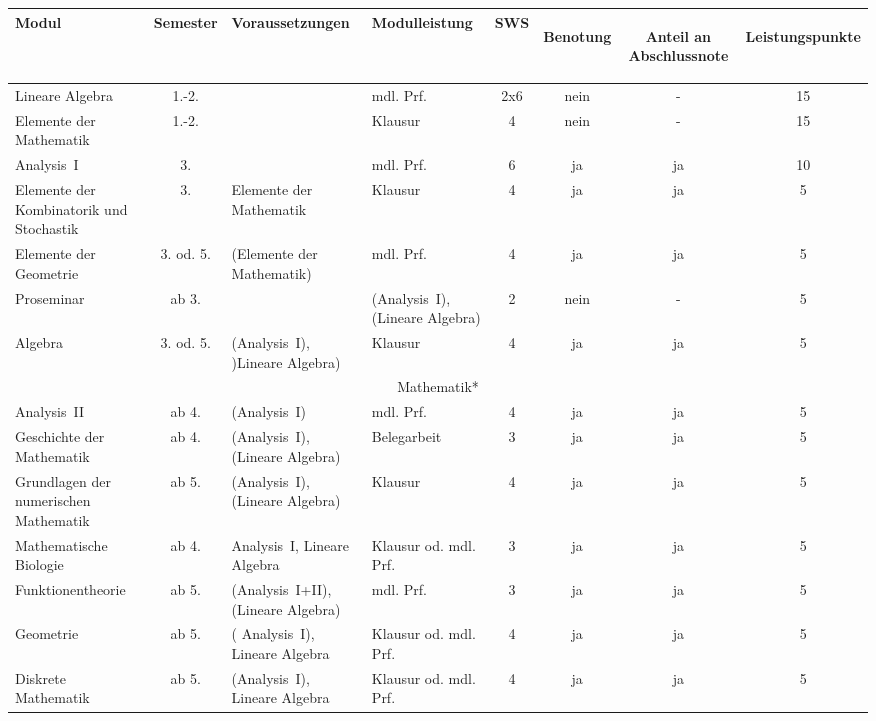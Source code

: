 \begin{table}[tbp]
    \begin{footnotesize}
    \begin{tabularx}{\textwidth}{|@{~}X@{~}|@{~}c@{~}|@{~}X@{~}|@{~}X@{~}|@{~}c@{~}|@{~}c@{~}|@{~}c@{~}|@{~}c@{~}|}
        \hline
        Modul & Semes\-ter & Voraus\-setzungen & Modul\-leistung & SWS & \begin{sideways}Be\-notung\end{sideways} & \begin{sideways}Anteil an Abschluss\-note \end{sideways}& \begin{sideways}Leistungspunkte\end{sideways}\\\hline\hline

        Lineare Algebra &1.-2.&&mdl. Prf.&2x6&nein&-&15\\\hline
        Elemente der Mathematik &1.-2.&&Klausur&4&nein&-&15\\\hline
        Analysis~I &3.&&mdl. Prf.&6&ja&ja&10\\\hline
        Elemente der Kombinatorik und Stochastik &3.&Elemente der Mathematik&Klausur&4&ja&ja&5\\\hline
        Elemente der Geometrie &3. od. 5.&(Elemente der Mathematik)&mdl. Prf.&4&ja&ja&5\\\hline
        Proseminar & ab 3. & & (Analysis~I),(Lineare Algebra) &2&nein&-&5\\\hline
        Algebra & 3. od. 5. &(Analysis~I), )Lineare Algebra) & Klausur & 4 & ja & ja & 5\\\hline\hline

        \multicolumn{8}{|c|}{Mathematik*}\\\hline
        Analysis~II & ab 4. & (Analysis~I) & mdl. Prf. & 4 & ja & ja & 5\\\hline
        Geschichte der Mathematik & ab 4. & (Analysis~I), (Lineare Algebra) & Belegarbeit & 3 & ja & ja & 5\\\hline
        Grundlagen der numerischen Mathematik & ab 5. & (Analysis~I), (Lineare Algebra) & Klausur & 4 & ja & ja & 5\\\hline
        Mathematische Biologie & ab 4. &Analysis~I, Lineare Algebra & Klausur od. mdl. Prf. & 3 & ja & ja & 5\\\hline
        Funktionentheorie & ab 5. & (Analysis~I+II),(Lineare Algebra)& mdl. Prf. & 3 & ja & ja & 5\\\hline
        Geometrie & ab 5. &( Analysis~I), Lineare Algebra & Klausur od. mdl. Prf. & 4 & ja & ja & 5\\\hline
        Diskrete Mathematik & ab 5. & (Analysis~I), Lineare Algebra & Klausur od. mdl. Prf. & 4 & ja & ja & 5\\\hline\hline


\end{tabularx}
\end{footnotesize}
\end{table}
